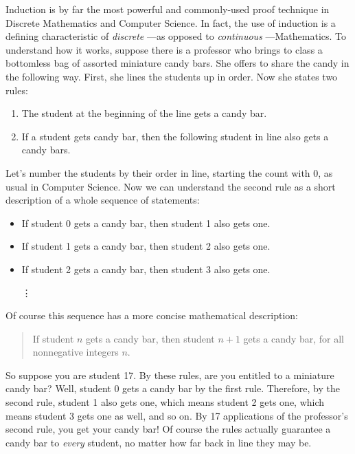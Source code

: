 
Induction is by far the most powerful and commonly-used proof technique in
Discrete Mathematics and Computer Science.  In fact, the use of induction
is a defining characteristic of \emph{discrete} ---as opposed to
\emph{continuous} ---Mathematics.
%
To understand how it works, suppose there is a professor who brings
to class a bottomless bag of assorted miniature candy bars.  She offers to
share the candy in the following way.  First, she lines the students up in
order.  Now she states two rules:

\begin{enumerate}
\item The student at the beginning of the line gets a candy bar.
\item If a student gets candy bar, then the following student in line
  also gets a candy bars.
\end{enumerate}
%
Let's number the students by their order in line, starting the count with
0, as usual in Computer Science.  Now we can understand the second rule as
a short description of a whole sequence of statements:
%
\begin{itemize}
\item If student 0 gets a candy bar, then student 1 also gets one.
\item If student 1 gets a candy bar, then student 2 also gets one.
\item If student 2 gets a candy bar, then student 3 also gets one.

\hspace{1.2in} \vdots
\end{itemize}
%
Of course this sequence has a more concise mathematical description:
\begin{quote}
  If student $n$ gets a candy bar, then student $n+1$ gets a
  candy bar, for all nonnegative integers $n$.
\end{quote}
So suppose you are student 17.  By these rules, are you entitled to a
miniature candy bar?  Well, student 0 gets a candy bar by the first rule.
Therefore, by the second rule, student 1 also gets one, which means
student 2 gets one, which means student 3 gets one as well, and so on.  By
17 applications of the professor's second rule, you get your candy bar!
Of course the rules actually guarantee a candy bar to \emph{every}
student, no matter how far back in line they may be.


